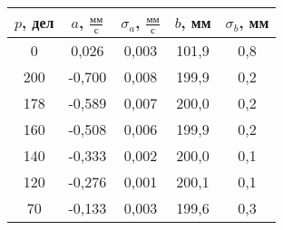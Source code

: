 \begin{tabular}[t]{|c|c|c|c|c|}
\hline
$p$, дел & $a$, $\frac{мм}{с}$ & $\sigma_a$, $\frac{мм}{с}$ & $b$, мм & $\sigma_b$, мм \\ 
\hline
0 & 0,026 & 0,003 & 101,9 & 0,8 \\ 
200 & -0,700 & 0,008 & 199,9 & 0,2 \\ 
178 & -0,589 & 0,007 & 200,0 & 0,2 \\ 
160 & -0,508 & 0,006 & 199,9 & 0,2 \\ 
140 & -0,333 & 0,002 & 200,0 & 0,1 \\ 
120 & -0,276 & 0,001 & 200,1 & 0,1 \\ 
70 & -0,133 & 0,003 & 199,6 & 0,3 \\ 
\hline
\end{tabular}